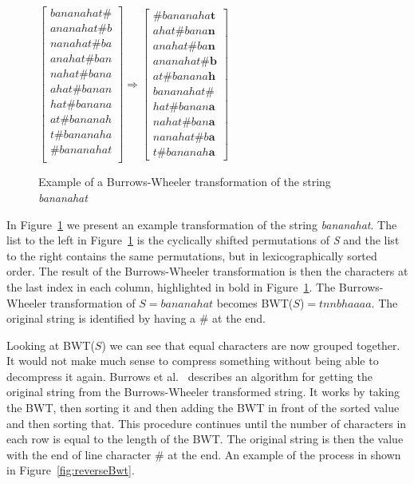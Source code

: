 \begin{figure}
\begin{center}
$\begin{bmatrix}
	bananahat\#\\
	ananahat\#b\\
	nanahat\#ba\\
	anahat\#ban\\
	nahat\#bana\\
	ahat\#banan\\
	hat\#banana\\
	at\#bananah\\
	t\#bananaha\\
	\#bananahat\\
\end{bmatrix} \Rightarrow
\begin{bmatrix}
	\#bananaha\textbf{t}\\
	ahat\#bana\textbf{n}\\
	anahat\#ba\textbf{n}\\
	ananahat\#\textbf{b}\\
	at\#banana\textbf{h}\\
	bananahat\#\\
	hat\#banan\textbf{a}\\
	nahat\#ban\textbf{a}\\
	nanahat\#b\textbf{a}\\
	t\#bananah\textbf{a}
\end{bmatrix}$
\end{center}
\caption{Example of a Burrows-Wheeler transformation of the string \textit{bananahat}}
\label{fig:BWTExample}
\end{figure}
In Figure~\ref{fig:BWTExample} we present an example transformation of the string \textit{bananahat}.
The list to the left in Figure~\ref{fig:BWTExample} is the cyclically shifted permutations of \textit{S} and the list to the right contains the same permutations, but in lexicographically sorted order.
The result of the Burrows-Wheeler transformation is then the characters at the last index in each column, highlighted in bold in Figure~\ref{fig:BWTExample}.
The Burrows-Wheeler transformation of $S=bananahat$ becomes BWT($S$)$ = tnnbhaaaa$.
The original string is identified by having a \# at the end.

Looking at BWT($S$) we can see that equal characters are now grouped together.
It would not make much sense to compress something without being able to decompress it again.
Burrows et al.~\citep[Section~2]{BWToriginalArticle} describes an algorithm for getting the original string from the Burrows-Wheeler transformed string.
It works by taking the BWT, then sorting it and then adding the BWT in front of the sorted value and then sorting that. 
This procedure continues until the number of characters in each row is equal to the length of the BWT. 
The original string is then the value with the end of line character \# at the end. 
An example of the process in shown in Figure~\ref{fig:reverseBwt}.

